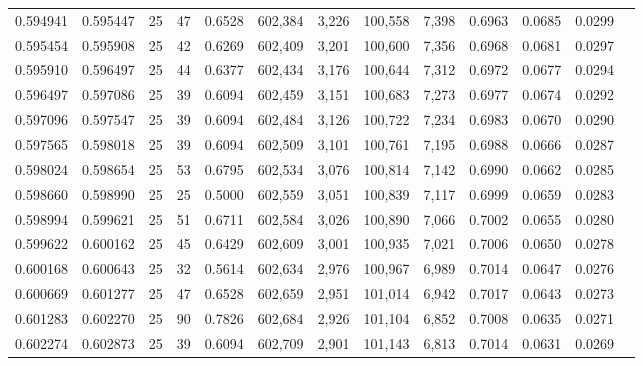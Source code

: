 \begin{tabular}{rrrrrrrrrrrrr}
0.594941 & 0.595447 &    25 &  47 &                                     0.6528 & 602,384 &   3,226 & 100,558 &   7,398 & 0.6963 & 0.0685 & 0.0299 \\
0.595454 & 0.595908 &    25 &  42 &                                     0.6269 & 602,409 &   3,201 & 100,600 &   7,356 & 0.6968 & 0.0681 & 0.0297 \\
0.595910 & 0.596497 &    25 &  44 &                                     0.6377 & 602,434 &   3,176 & 100,644 &   7,312 & 0.6972 & 0.0677 & 0.0294 \\
0.596497 & 0.597086 &    25 &  39 &                                     0.6094 & 602,459 &   3,151 & 100,683 &   7,273 & 0.6977 & 0.0674 & 0.0292 \\
0.597096 & 0.597547 &    25 &  39 &                                     0.6094 & 602,484 &   3,126 & 100,722 &   7,234 & 0.6983 & 0.0670 & 0.0290 \\
0.597565 & 0.598018 &    25 &  39 &                                     0.6094 & 602,509 &   3,101 & 100,761 &   7,195 & 0.6988 & 0.0666 & 0.0287 \\
0.598024 & 0.598654 &    25 &  53 &                                     0.6795 & 602,534 &   3,076 & 100,814 &   7,142 & 0.6990 & 0.0662 & 0.0285 \\
0.598660 & 0.598990 &    25 &  25 &                                     0.5000 & 602,559 &   3,051 & 100,839 &   7,117 & 0.6999 & 0.0659 & 0.0283 \\
0.598994 & 0.599621 &    25 &  51 &                                     0.6711 & 602,584 &   3,026 & 100,890 &   7,066 & 0.7002 & 0.0655 & 0.0280 \\
0.599622 & 0.600162 &    25 &  45 &                                     0.6429 & 602,609 &   3,001 & 100,935 &   7,021 & 0.7006 & 0.0650 & 0.0278 \\
0.600168 & 0.600643 &    25 &  32 &                                     0.5614 & 602,634 &   2,976 & 100,967 &   6,989 & 0.7014 & 0.0647 & 0.0276 \\
0.600669 & 0.601277 &    25 &  47 &                                     0.6528 & 602,659 &   2,951 & 101,014 &   6,942 & 0.7017 & 0.0643 & 0.0273 \\
0.601283 & 0.602270 &    25 &  90 &                                     0.7826 & 602,684 &   2,926 & 101,104 &   6,852 & 0.7008 & 0.0635 & 0.0271 \\
0.602274 & 0.602873 &    25 &  39 &                                     0.6094 & 602,709 &   2,901 & 101,143 &   6,813 & 0.7014 & 0.0631 & 0.0269 \\

\end{tabular}

